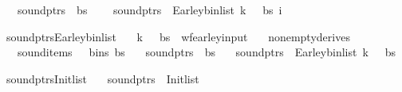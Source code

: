\begin{isabellebody}
\ \ \ {\isachardoublequoteopen}sound{\isacharunderscore}{\kern0pt}ptrs\ {\isasymomega}\ bs{\isachardoublequoteclose}\ \isanewline
\ \ \ {\isachardoublequoteopen}sound{\isacharunderscore}{\kern0pt}ptrs\ {\isasymomega}\ {\isacharparenleft}{\kern0pt}Earley{\isacharunderscore}{\kern0pt}bin{\isacharunderscore}{\kern0pt}list{\isacharprime}{\kern0pt}\ k\ {\isasymG}\ {\isasymomega}\ bs\ i{\isacharparenright}{\kern0pt}{\isachardoublequoteclose}%
\isadelimproof
%
\endisadelimproof
%
\isatagproof
%
\endisatagproof
{\isafoldproof}%
%
\isadelimproof
%
\endisadelimproof
%
\begin{isamarkuptext}%
%
\end{isamarkuptext}\isamarkuptrue%
\isamarkupfalse%
\ sound{\isacharunderscore}{\kern0pt}ptrs{\isacharunderscore}{\kern0pt}Earley{\isacharunderscore}{\kern0pt}bin{\isacharunderscore}{\kern0pt}list{\isacharcolon}{\kern0pt}\isanewline
\ \ \ {\isachardoublequoteopen}{\isacharparenleft}{\kern0pt}k{\isacharcomma}{\kern0pt}\ {\isasymG}{\isacharcomma}{\kern0pt}\ {\isasymomega}{\isacharcomma}{\kern0pt}\ bs{\isacharparenright}{\kern0pt}\ {\isasymin}\ wf{\isacharunderscore}{\kern0pt}earley{\isacharunderscore}{\kern0pt}input{\isachardoublequoteclose}\isanewline
\ \ \ {\isachardoublequoteopen}nonempty{\isacharunderscore}{\kern0pt}derives\ {\isasymG}{\isachardoublequoteclose}\isanewline
\ \ \ {\isachardoublequoteopen}sound{\isacharunderscore}{\kern0pt}items\ {\isasymG}\ {\isasymomega}\ {\isacharparenleft}{\kern0pt}bins\ bs{\isacharparenright}{\kern0pt}{\isachardoublequoteclose}\isanewline
\ \ \ {\isachardoublequoteopen}sound{\isacharunderscore}{\kern0pt}ptrs\ {\isasymomega}\ bs{\isachardoublequoteclose}\isanewline
\ \ \ {\isachardoublequoteopen}sound{\isacharunderscore}{\kern0pt}ptrs\ {\isasymomega}\ {\isacharparenleft}{\kern0pt}Earley{\isacharunderscore}{\kern0pt}bin{\isacharunderscore}{\kern0pt}list\ k\ {\isasymG}\ {\isasymomega}\ bs{\isacharparenright}{\kern0pt}{\isachardoublequoteclose}%
\isadelimproof
%
\endisadelimproof
%
\isatagproof
%
\endisatagproof
{\isafoldproof}%
%
\isadelimproof
%
\endisadelimproof
%
\begin{isamarkuptext}%
%
\end{isamarkuptext}\isamarkuptrue%
\isamarkupfalse%
\ sound{\isacharunderscore}{\kern0pt}ptrs{\isacharunderscore}{\kern0pt}Init{\isacharunderscore}{\kern0pt}list{\isacharcolon}{\kern0pt}\isanewline
\ \ \ {\isachardoublequoteopen}sound{\isacharunderscore}{\kern0pt}ptrs\ {\isasymomega}\ {\isacharparenleft}{\kern0pt}Init{\isacharunderscore}{\kern0pt}list\ {\isasymG}\ {\isasymomega}{\isacharparenright}{\kern0pt}{\isachardoublequoteclose}%

\end{isabellebody}
